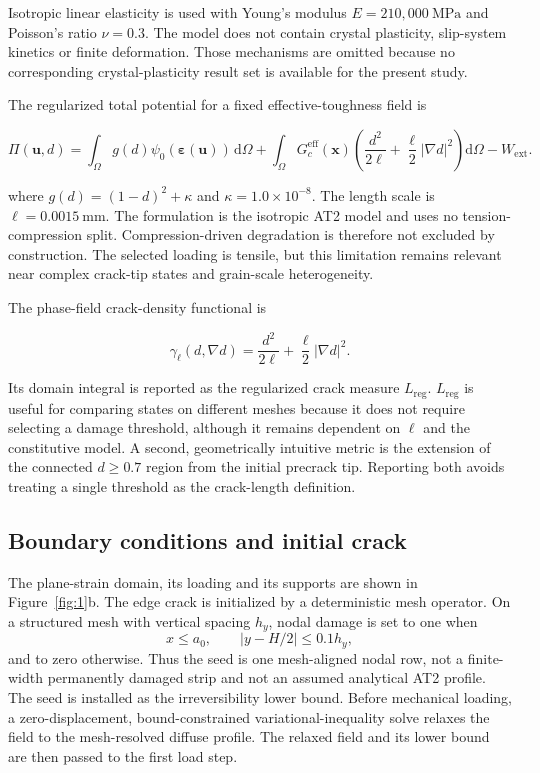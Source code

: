 \documentclass[preprint,12pt]{elsarticle}
\begin{document}
Isotropic linear elasticity is used with Young's modulus \(E=210{,}000~\mathrm{MPa}\) and Poisson's ratio \(\nu=0.3\). The model does not contain crystal plasticity, slip-system kinetics or finite deformation. Those mechanisms are omitted because no corresponding crystal-plasticity result set is available for the present study.

The regularized total potential for a fixed effective-toughness field is

\begin{equation}
\Pi(\mathbf{u},d)=\int_{\Omega}g(d)\psi_0(\boldsymbol{\varepsilon}(\mathbf{u}))\,\mathrm{d}\Omega+\int_{\Omega}G_c^{\mathrm{eff}}(\mathbf{x})\left(\frac{d^2}{2\ell}+\frac{\ell}{2}\lvert\nabla d\rvert^2\right)\mathrm{d}\Omega-W_{\mathrm{ext}}.
\end{equation}

where \(g(d)=(1-d)^2+\kappa\) and \(\kappa=1.0\times10^{-8}\). The length scale is \(\ell=0.0015~\mathrm{mm}\). The formulation is the isotropic AT2 model and uses no tension-compression split. Compression-driven degradation is therefore not excluded by construction. The selected loading is tensile, but this limitation remains relevant near complex crack-tip states and grain-scale heterogeneity.

The phase-field crack-density functional is

\begin{equation}
\gamma_{\ell}(d,\nabla d)=\frac{d^2}{2\ell}+\frac{\ell}{2}\lvert\nabla d\rvert^2.
\end{equation}

Its domain integral is reported as the regularized crack measure \(L_{\mathrm{reg}}\). \(L_{\mathrm{reg}}\) is useful for comparing states on different meshes because it does not require selecting a damage threshold, although it remains dependent on \(\ell\) and the constitutive model. A second, geometrically intuitive metric is the extension of the connected \(d\ge0.7\) region from the initial precrack tip. Reporting both avoids treating a single threshold as the crack-length definition.

\subsection{Boundary conditions and initial crack}
The plane-strain domain, its loading and its supports are shown in
Figure~\ref{fig:1}b. The edge crack is initialized by a deterministic mesh
operator. On a structured mesh with vertical spacing $h_y$, nodal damage is set
to one when
\[
x\le a_0,\qquad |y-H/2|\le0.1h_y,
\]
and to zero otherwise. Thus the seed is one mesh-aligned nodal row, not a
finite-width permanently damaged strip and not an assumed analytical AT2 profile.
The seed is installed as the irreversibility lower bound. Before mechanical
loading, a zero-displacement, bound-constrained variational-inequality solve
relaxes the field to the mesh-resolved diffuse profile. The relaxed field and its
lower bound are then passed to the first load step.
\end{document}
